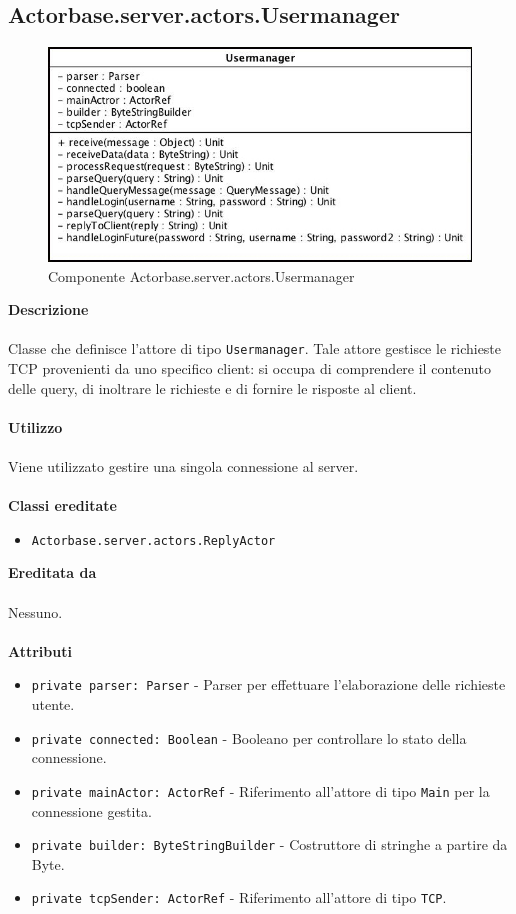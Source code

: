 \documentclass[a4paper]{article}
\begin{document}
	\subsection{Actorbase.server.actors.Usermanager}
		\begin{figure}[H]
			\centering
			\includegraphics[width=\textwidth]{Server/usermanager.jpg}
			\caption{Componente Actorbase.server.actors.Usermanager}
		\end{figure}
		\textbf{Descrizione}
			\\ \\
			Classe che definisce l'attore di tipo \texttt{Usermanager}. Tale attore gestisce le richieste TCP provenienti da uno specifico client: si occupa di comprendere il contenuto delle query, di inoltrare le richieste e di fornire le risposte al client.
			\\ \\
		\textbf{Utilizzo}
			\\ \\
			Viene utilizzato gestire una singola connessione al server.
			\\ \\
		\textbf{Classi ereditate}
			\begin{itemize}
				\item \texttt{Actorbase.server.actors.ReplyActor}
			\end{itemize}
		\textbf{Ereditata da}
			\\ \\
			Nessuno.
			\\ \\
		\textbf{Attributi}
			\begin{itemize}
				\item \texttt{private parser: Parser} - Parser per effettuare l'elaborazione delle richieste utente.
				\item \texttt{private connected: Boolean} - Booleano per controllare lo stato della connessione.
				\item \texttt{private mainActor: ActorRef} - Riferimento all'attore di tipo \texttt{Main} per la connessione gestita.
				\item \texttt{private builder: ByteStringBuilder} - Costruttore di stringhe a partire da Byte.
				\item \texttt{private tcpSender: ActorRef} - Riferimento all'attore di tipo \texttt{TCP}.
			\end{itemize}
\end{document}
